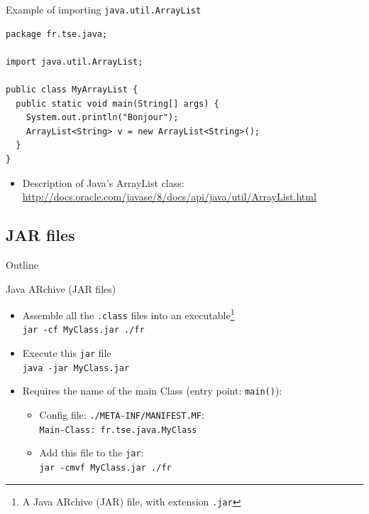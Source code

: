 \documentclass[English,c,%
hyperref={%
    pdftitle={FISA-DE2 OOP in Java},%
    pdfauthor={Muller, Gravier, Laforest, Subercaze},%
    pdfsubject={OOP in Java},%
    pdfkeywords={OOP, Java},%
    colorlinks=true,%
    urlcolor=blue,%
    linkcolor=%
    },%
xcolor={pdftex,svgnames} %
]{beamer}
\begin{document}
\begin{frame}[fragile]{Example of importing \texttt{java.util.ArrayList}}

\begin{lstlisting}[escapechar=\%,label=myarraylistpackage,caption=MyArrayList.java]
package fr.tse.java;

import java.util.ArrayList;

public class MyArrayList {
  public static void main(String[] args) {
    System.out.println("Bonjour");
    ArrayList<String> v = new ArrayList<String>();
  }
}
\end{lstlisting}

  \bigskip
\begin{itemize}
  \item Description of Java's ArrayList class:\\
  \url{http://docs.oracle.com/javase/8/docs/api/java/util/ArrayList.html}
\end{itemize}

\end{frame}


\subsection{JAR files}
   \begin{frame}{Outline}
       \tableofcontents[currentsubsection]
   \end{frame}

\begin{frame}{Java ARchive (JAR files)}
\begin{itemize}
    \item Assemble all the \texttt{.class} files into an executable\footnote{A Java ARchive (JAR) file, with extension \texttt{.jar}}\\
    \texttt{jar -cf MyClass.jar ./fr}
    \pause
    \medskip
    \item Execute this \texttt{jar} file\\
    \texttt{java -jar MyClass.jar}
    \pause
    \medskip
    \item Requires the name of the main Class (entry point: \texttt{main()}):
    \begin{itemize}
      \item Config file: \texttt{./META-INF/MANIFEST.MF}:\\
      \texttt{Main-Class: fr.tse.java.MyClass}
      \item Add this file to the \texttt{jar}:\\
      \texttt{jar -cmvf MyClass.jar ./fr}
    \end{itemize}
\end{itemize}
\end{frame}
\end{document}
